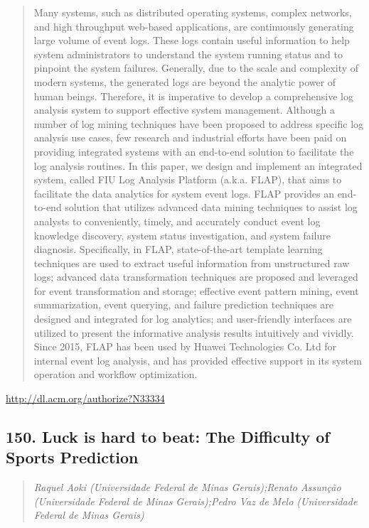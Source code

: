 \documentclass{article}
\begin{document}
\begin{quote}
Many systems, such as distributed operating systems, complex networks, and high throughput web-based applications, are continuously generating large volume of event logs. These logs contain useful information to help system administrators to understand the system running status and to pinpoint the system failures. Generally, due to the scale and complexity of modern systems, the generated logs are beyond the analytic power of human beings. Therefore, it is imperative to develop a comprehensive log analysis system to support effective system management. Although a number of log mining techniques have been proposed to address specific log analysis use cases, few research and industrial efforts have been paid on providing integrated systems with an end-to-end solution to facilitate the log analysis routines. In this paper, we design and implement an integrated system, called FIU Log Analysis Platform (a.k.a. FLAP), that aims to facilitate the data analytics for system event logs. FLAP provides an end-to-end solution that utilizes advanced data mining techniques to assist log analysts to conveniently, timely, and accurately conduct event log knowledge discovery, system status investigation, and system failure diagnosis. Specifically, in FLAP, state-of-the-art template learning techniques are used to extract useful information from unstructured raw logs; advanced data transformation techniques are proposed and leveraged for event transformation and storage; effective event pattern mining, event summarization, event querying, and failure prediction techniques are designed and integrated for log analytics; and user-friendly interfaces are utilized to present the informative analysis results intuitively and vividly. Since 2015, FLAP has been used by Huawei Technologies Co. Ltd for internal event log analysis, and has provided effective support in its system operation and workflow optimization.
\end{quote}

\href{http://dl.acm.org/authorize?N33334}{http://dl.acm.org/authorize?N33334}

\subsection{150. Luck is hard to beat: The Difficulty of Sports Prediction}

\begin{quote}
\footnotesize{\textit{Raquel Aoki (Universidade Federal de Minas Gerais);Renato Assunção (Universidade Federal de Minas Gerais);Pedro Vaz de Melo (Universidade Federal de Minas Gerais)}}

\end{quote}
\end{document}
